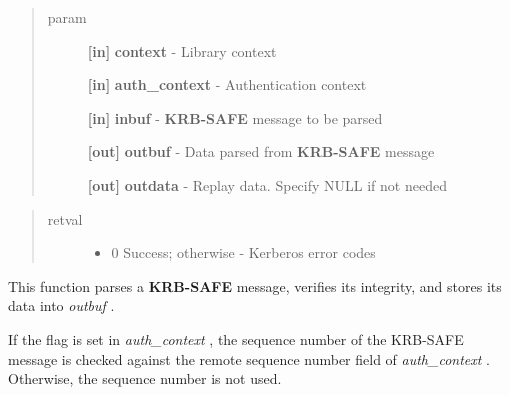 \documentclass[letterpaper,10pt,english]{sphinxmanual}
\begin{document}
\begin{fulllineitems}
\label{appdev/refs/api/krb5_rd_safe:c.krb5_rd_safe}
\end{fulllineitems}

\begin{quote}\begin{description}
\item[{param}] \leavevmode
\textbf{{[}in{]}} \textbf{context} - Library context

\textbf{{[}in{]}} \textbf{auth\_context} - Authentication context

\textbf{{[}in{]}} \textbf{inbuf} - \textbf{KRB-SAFE} message to be parsed

\textbf{{[}out{]}} \textbf{outbuf} - Data parsed from \textbf{KRB-SAFE} message

\textbf{{[}out{]}} \textbf{outdata} - Replay data. Specify NULL if not needed

\end{description}\end{quote}
\begin{quote}\begin{description}
\item[{retval}] \leavevmode\begin{itemize}
\item {} 
0   Success; otherwise - Kerberos error codes

\end{itemize}

\end{description}\end{quote}

This function parses a \textbf{KRB-SAFE} message, verifies its integrity, and stores its data into \emph{outbuf} .

If the {\hyperref[appdev/refs/macros/KRB5_AUTH_CONTEXT_DO_SEQUENCE:KRB5_AUTH_CONTEXT_DO_SEQUENCE]{}} flag is set in \emph{auth\_context} , the sequence number of the KRB-SAFE message is checked against the remote sequence number field of \emph{auth\_context} . Otherwise, the sequence number is not used.
\end{document}
